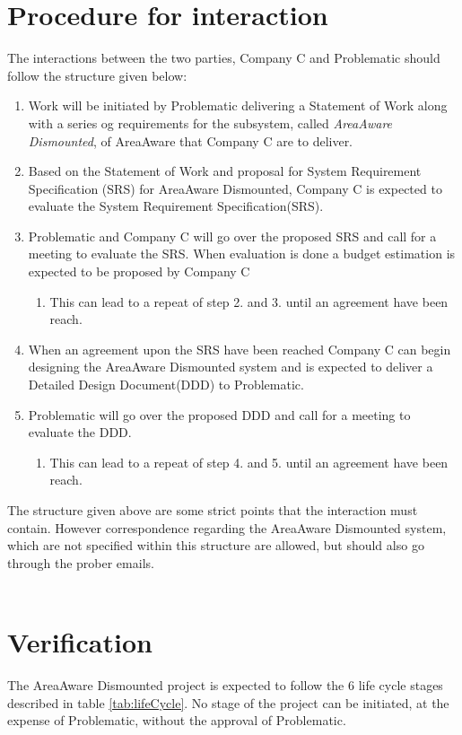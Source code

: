 \chapter{Procedure for interaction}
The interactions between the two parties, Company C and Problematic should follow the structure given below:
\begin{enumerate}
    \item Work will be initiated by Problematic delivering a Statement of Work along with a series og requirements for the subsystem, called \emph{AreaAware Dismounted}, of AreaAware that Company C are to deliver.
    \item Based on the Statement of Work and proposal for System Requirement Specification (SRS) for AreaAware Dismounted, Company C is expected to evaluate the System Requirement Specification(SRS).
    \item Problematic and Company C will go over the proposed SRS and call for a meeting to evaluate the SRS. When evaluation is done a budget estimation is expected to be proposed by Company C
    \begin{enumerate}
        \item This can lead to a repeat of step 2. and 3. until an agreement have been reach.
    \end{enumerate}
    \item When an agreement upon the SRS have been reached Company C can begin designing the AreaAware Dismounted system and is expected to deliver a Detailed Design Document(DDD) to Problematic.
    \item Problematic will go over the proposed DDD and call for a meeting to evaluate the DDD.
    \begin{enumerate}
        \item This can lead to a repeat of step 4. and 5. until an agreement have been reach.
    \end{enumerate}
\end{enumerate}
The structure given above are some strict points that the interaction must contain.
However correspondence regarding the AreaAware Dismounted system, which are not specified within this structure are allowed, but should also go through the prober emails.\\\\


\chapter{Verification}
The AreaAware Dismounted project is expected to follow the 6 life cycle stages described in table \ref{tab:lifeCycle}.
No stage of the project can be initiated, at the expense of Problematic, without the approval of Problematic.

